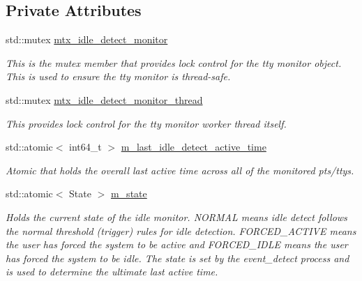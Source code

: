 \subsection*{Private Attributes}
\begin{DoxyCompactItemize}
\item 
\mbox{\label{classEventDetect_1_1IdleDetectMonitor_a5a701c9f31c680cda110cdaa8a527da1}} 
std\+::mutex \mbox{\hyperlink{classEventDetect_1_1IdleDetectMonitor_a5a701c9f31c680cda110cdaa8a527da1}{mtx\+\_\+idle\+\_\+detect\+\_\+monitor}}
\begin{DoxyCompactList}\small\item\em This is the mutex member that provides lock control for the tty monitor object. This is used to ensure the tty monitor is thread-\/safe. \end{DoxyCompactList}\item 
\mbox{\label{classEventDetect_1_1IdleDetectMonitor_abf3c0cc87481f3f68db72ecae4c2a609}} 
std\+::mutex \mbox{\hyperlink{classEventDetect_1_1IdleDetectMonitor_abf3c0cc87481f3f68db72ecae4c2a609}{mtx\+\_\+idle\+\_\+detect\+\_\+monitor\+\_\+thread}}
\begin{DoxyCompactList}\small\item\em This provides lock control for the tty monitor worker thread itself. \end{DoxyCompactList}\item 
\mbox{\label{classEventDetect_1_1IdleDetectMonitor_acc9798f26d29719e8dffae5ed358fa43}} 
std\+::atomic$<$ int64\+\_\+t $>$ \mbox{\hyperlink{classEventDetect_1_1IdleDetectMonitor_acc9798f26d29719e8dffae5ed358fa43}{m\+\_\+last\+\_\+idle\+\_\+detect\+\_\+active\+\_\+time}}
\begin{DoxyCompactList}\small\item\em Atomic that holds the overall last active time across all of the monitored pts/ttys. \end{DoxyCompactList}\item 
\mbox{\label{classEventDetect_1_1IdleDetectMonitor_ae4ede844ecda97f5f6acd91a6dcc81f7}} 
std\+::atomic$<$ State $>$ \mbox{\hyperlink{classEventDetect_1_1IdleDetectMonitor_ae4ede844ecda97f5f6acd91a6dcc81f7}{m\+\_\+state}}
\begin{DoxyCompactList}\small\item\em Holds the current state of the idle monitor. N\+O\+R\+M\+AL means idle detect follows the normal threshold (trigger) rules for idle detection. F\+O\+R\+C\+E\+D\+\_\+\+A\+C\+T\+I\+VE means the user has forced the system to be active and F\+O\+R\+C\+E\+D\+\_\+\+I\+D\+LE means the user has forced the system to be idle. The state is set by the event\+\_\+detect process and is used to determine the ultimate last active time. \end{DoxyCompactList}\item 

\end{DoxyCompactItemize}
